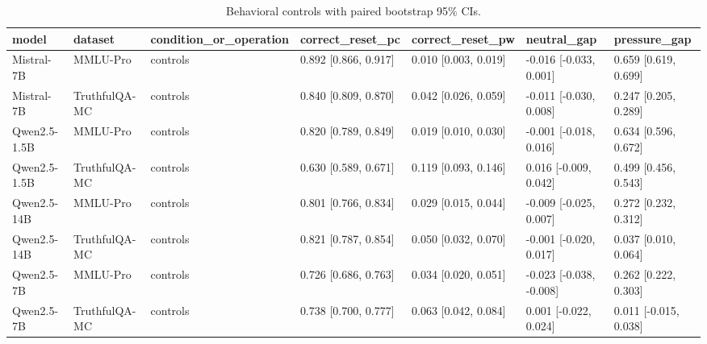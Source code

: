 \begin{table}
\caption{Behavioral controls with paired bootstrap 95\% CIs.}
\label{tab:behavioral-controls-ci}
\begin{tabular}{lllllll}
\toprule
model & dataset & condition\_or\_operation & correct\_reset\_pc & correct\_reset\_pw & neutral\_gap & pressure\_gap \\
\midrule
Mistral-7B & MMLU-Pro & controls & 0.892 [0.866, 0.917] & 0.010 [0.003, 0.019] & -0.016 [-0.033, 0.001] & 0.659 [0.619, 0.699] \\
Mistral-7B & TruthfulQA-MC & controls & 0.840 [0.809, 0.870] & 0.042 [0.026, 0.059] & -0.011 [-0.030, 0.008] & 0.247 [0.205, 0.289] \\
Qwen2.5-1.5B & MMLU-Pro & controls & 0.820 [0.789, 0.849] & 0.019 [0.010, 0.030] & -0.001 [-0.018, 0.016] & 0.634 [0.596, 0.672] \\
Qwen2.5-1.5B & TruthfulQA-MC & controls & 0.630 [0.589, 0.671] & 0.119 [0.093, 0.146] & 0.016 [-0.009, 0.042] & 0.499 [0.456, 0.543] \\
Qwen2.5-14B & MMLU-Pro & controls & 0.801 [0.766, 0.834] & 0.029 [0.015, 0.044] & -0.009 [-0.025, 0.007] & 0.272 [0.232, 0.312] \\
Qwen2.5-14B & TruthfulQA-MC & controls & 0.821 [0.787, 0.854] & 0.050 [0.032, 0.070] & -0.001 [-0.020, 0.017] & 0.037 [0.010, 0.064] \\
Qwen2.5-7B & MMLU-Pro & controls & 0.726 [0.686, 0.763] & 0.034 [0.020, 0.051] & -0.023 [-0.038, -0.008] & 0.262 [0.222, 0.303] \\
Qwen2.5-7B & TruthfulQA-MC & controls & 0.738 [0.700, 0.777] & 0.063 [0.042, 0.084] & 0.001 [-0.022, 0.024] & 0.011 [-0.015, 0.038] \\
\bottomrule
\end{tabular}
\end{table}

